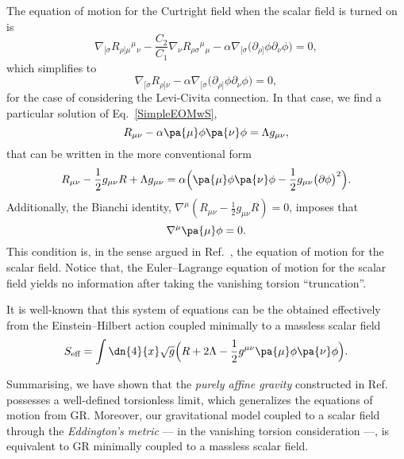 \documentclass[aps,prl,twocolumn,superscriptaddress,showpacs,showkeys]{revtex4-1}
\begin{document}
The equation of motion for the Curtright field when the scalar field is turned on is
\begin{equation*}
  \nabla_{[\sigma} R_{\rho]\mu}{}^{\mu}{}_\nu - \frac{C_2}{C_1} \nabla_\nu  R_{\rho\sigma}{}^{\mu}{}_\mu - \alpha \nabla_{[\sigma} \Big( \partial_{\rho]}\phi \partial_\nu\phi \Big) = 0,
\end{equation*}
which simplifies to 
\begin{equation}
  \nabla_{[\sigma} R_{\rho]\nu} - \alpha \nabla_{[\sigma} \Big( \partial_{\rho]}\phi \partial_\nu\phi \Big) = 0,
  \label{SimpleEOMwS}
\end{equation}
for the case of considering the Levi-Civita connection. In that case, we find a particular solution of Eq.~\eqref{SimpleEOMwS},
\begin{equation*}
  R_{\mu\nu} - \alpha \pa{\mu} \phi \pa{\nu} \phi = \Lambda g_{\mu\nu},
\end{equation*}
that can be written in the more conventional form
\begin{equation}
  R_{\mu\nu} - \frac{1}{2} g_{\mu\nu} R + \Lambda g_{\mu\nu} = \alpha \Big( \pa{\mu} \phi \pa{\nu} \phi - \frac{1}{2} g_{\mu\nu} \big( \partial\phi \big)^2 \Big).
\end{equation}
Additionally, the Bianchi identity, \mbox{$\nabla^\mu \left( R_{\mu\nu} - \frac{1}{2} g_{\mu\nu} R \right) = 0$,} imposes that
\begin{equation}
  \nabla^\mu \pa{\mu} \phi = 0.
\end{equation}
This condition is, in the sense argued in Ref.~\cite{Bekenstein:2014uwa}, the equation of motion for the scalar field. Notice that, the Euler--Lagrange equation of motion for the scalar field yields no information after taking the vanishing torsion ``truncation''.

It is well-known that this system of equations can be the obtained effectively from the Einstein--Hilbert action coupled minimally to a massless scalar field
\begin{equation}
  S_{\text{eff}} = \int \dn{4}{x} \sqrt{g} \Big( R + 2 \Lambda - \frac{1}{2} g^{\mu\nu} \pa{\mu}\phi \pa{\nu} \phi \Big).
\end{equation}

Summarising, we have shown that the  \emph{purely affine gravity} constructed in Ref.~\cite{Skirzewski:2014eta} possesses a well-defined torsionless limit, which generalizes the equations of motion  from GR. Moreover, our gravitational model coupled to a scalar field through the \emph{Eddington's metric} --- in the vanishing torsion consideration ---, is equivalent to GR minimally coupled to a massless scalar field.
\end{document}
